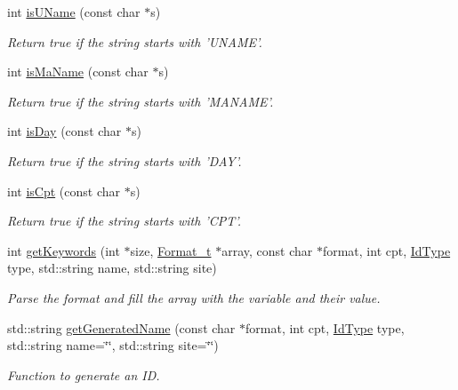 \begin{DoxyCompactItemize}
int \hyperlink{namespacevishnu_ac123696febe0c4b8fa9f6d59daa6062b}{isUName} (const char $\ast$s)
\begin{DoxyCompactList}\small\item\em Return true if the string starts with 'UNAME'. \item\end{DoxyCompactList}\item 
int \hyperlink{namespacevishnu_ad10441f9e198c7d70038dcd74963dc54}{isMaName} (const char $\ast$s)
\begin{DoxyCompactList}\small\item\em Return true if the string starts with 'MANAME'. \item\end{DoxyCompactList}\item 
int \hyperlink{namespacevishnu_a11a59f26c9f250498ef8aed73e316c8b}{isDay} (const char $\ast$s)
\begin{DoxyCompactList}\small\item\em Return true if the string starts with 'DAY'. \item\end{DoxyCompactList}\item 
int \hyperlink{namespacevishnu_a9f8370bcc63bc78bd464447eecbee191}{isCpt} (const char $\ast$s)
\begin{DoxyCompactList}\small\item\em Return true if the string starts with 'CPT'. \item\end{DoxyCompactList}\item 
int \hyperlink{namespacevishnu_a04e3438b8bba4e8074e5102cccfd6cd1}{getKeywords} (int $\ast$size, \hyperlink{structFormat__t}{Format\_\-t} $\ast$array, const char $\ast$format, int cpt, \hyperlink{namespacevishnu_aff8a694c2bc2b55465a31b4bf00f58c1}{IdType} type, std::string name, std::string site)
\begin{DoxyCompactList}\small\item\em Parse the format and fill the array with the variable and their value. \item\end{DoxyCompactList}\item 
std::string \hyperlink{namespacevishnu_a1ac2452cabb31484e501d0e568a342c3}{getGeneratedName} (const char $\ast$format, int cpt, \hyperlink{namespacevishnu_aff8a694c2bc2b55465a31b4bf00f58c1}{IdType} type, std::string name=\char`\"{}\char`\"{}, std::string site=\char`\"{}\char`\"{})
\begin{DoxyCompactList}\small\item\em Function to generate an ID. \item\end{DoxyCompactList}\item 

\end{DoxyCompactItemize}
